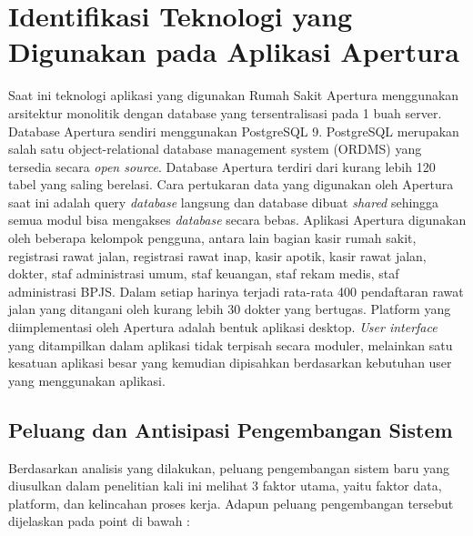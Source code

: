 \section{Identifikasi Teknologi yang Digunakan pada Aplikasi Apertura}
Saat ini teknologi aplikasi yang digunakan Rumah Sakit Apertura menggunakan arsitektur monolitik dengan database yang tersentralisasi pada 1 buah server. Database Apertura sendiri menggunakan PostgreSQL 9. PostgreSQL merupakan salah satu object-relational database management system (ORDMS) yang tersedia secara \textit{open source}. Database Apertura terdiri dari kurang lebih 120 tabel yang saling berelasi. Cara pertukaran data yang digunakan oleh Apertura saat ini adalah query \textit{database} langsung dan database dibuat \textit{shared} sehingga semua modul bisa mengakses \textit{database} secara bebas.
Aplikasi Apertura digunakan oleh beberapa kelompok pengguna, antara lain bagian kasir rumah sakit, registrasi rawat jalan, registrasi rawat inap, kasir apotik, kasir rawat jalan, dokter, staf administrasi umum, staf keuangan, staf rekam medis, staf administrasi BPJS. Dalam setiap harinya terjadi rata-rata 400 pendaftaran rawat jalan yang ditangani oleh kurang lebih 30 dokter yang bertugas.
Platform yang diimplementasi oleh Apertura adalah bentuk aplikasi desktop. \textit{User interface} yang ditampilkan dalam aplikasi tidak terpisah secara moduler, melainkan satu kesatuan aplikasi besar yang kemudian dipisahkan berdasarkan kebutuhan user yang menggunakan aplikasi.

\subsection{Peluang dan Antisipasi Pengembangan Sistem}
Berdasarkan analisis yang dilakukan, peluang pengembangan sistem baru yang diusulkan dalam penelitian kali ini melihat 3 faktor utama, yaitu faktor data, platform, dan kelincahan proses kerja. Adapun peluang pengembangan tersebut dijelaskan pada point di bawah :

